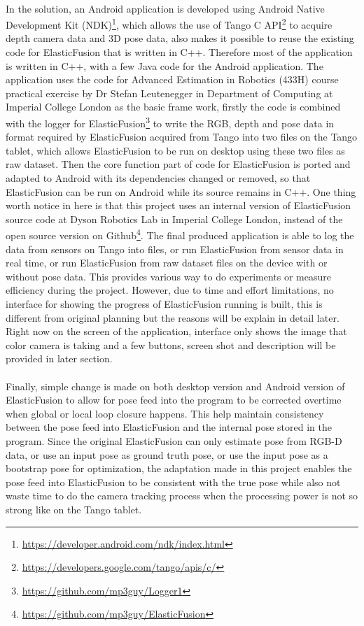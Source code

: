 \documentclass[12pt,twoside]{article}
\begin{document}
\\
In the solution, an Android application is developed using Android Native Development Kit (NDK)\footnote{\url{https://developer.android.com/ndk/index.html}}, which allows the use of Tango C API\footnote{\url{https://developers.google.com/tango/apis/c/}} to acquire depth camera data and 3D pose data, also makes it possible to reuse the existing code for ElasticFusion that is written in C++. Therefore most of the application is written in C++, with a few Java code for the Android application. The application uses the code for Advanced Estimation in Robotics (433H) course practical exercise by Dr Stefan Leutenegger in Department of Computing at Imperial College London as the basic frame work, firstly the code is combined with the logger for ElasticFusion\footnote{\url{https://github.com/mp3guy/Logger1}} to write the RGB, depth and pose data in format required by ElasticFusion acquired from Tango into two files on the Tango tablet, which allows ElasticFusion to be run on desktop using these two files as raw dataset. Then the core function part of code for ElasticFusion is ported and adapted to Android with its dependencies changed or removed, so that ElasticFusion can be run on Android while its source remains in C++. One thing worth notice in here is that this project uses an internal version of ElasticFusion source code at Dyson Robotics Lab in Imperial College London, instead of the open source version on Github\footnote{\url{https://github.com/mp3guy/ElasticFusion}}. The final produced application is able to log the data from sensors on Tango into files, or run ElasticFusion from sensor data in real time, or run ElasticFusion from raw dataset files on the device with or without pose data. This provides various way to do experiments or measure  efficiency during the project. However, due to time and effort limitations, no interface for showing the progress of ElasticFusion running is built, this is different from original planning but the reasons will be explain in detail later. Right now on the screen of the application, interface only shows the image that color camera is taking and a few buttons, screen shot and description will be provided in later section.\\
\\
Finally, simple change is made on both desktop version and Android version of ElasticFusion to allow for pose feed into the program to be corrected overtime when global or local loop closure happens. This help maintain consistency between the pose feed into ElasticFusion and the internal pose stored in the program. Since the original ElasticFusion can only estimate pose from RGB-D data, or use an input pose as ground truth pose, or use the input pose as a bootstrap pose for optimization, the adaptation made in this project enables the pose feed into ElasticFusion to be consistent with the true pose while also not waste time to do the camera tracking process when the processing power is not so strong like on the Tango tablet.\\
\end{document}
